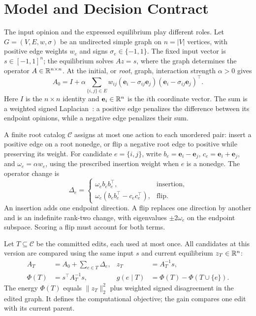 \section{Model and Decision Contract}
\label{sec:contract}

The input opinion and the expressed equilibrium play different roles. Let $G=(V,E,w,\sigma)$ be an undirected simple graph on $n=|V|$ vertices, with positive edge weights $w_e$ and signs $\sigma_e\in\{-1,1\}$. The fixed input vector is $s\in[-1,1]^n$; the equilibrium solves $Az=s$, where the graph determines the operator $A\in\mathbb R^{n\times n}$. At the initial, or \emph{root}, graph, interaction strength $\alpha>0$ gives
\begin{equation}
 A_0=I+\alpha\sum_{\{i,j\}\in E}w_{ij}
 (\mathbf e_i-\sigma_{ij}\mathbf e_j)
 (\mathbf e_i-\sigma_{ij}\mathbf e_j)^\top.
 \label{eq:operator}
\end{equation}
Here $I$ is the $n\times n$ identity and $\mathbf e_i\in\mathbb R^n$ is the $i$th coordinate vector. The sum is a weighted signed Laplacian~\cite{Kunegis_2010}: a positive edge penalizes the difference between its endpoint opinions, while a negative edge penalizes their sum.

A finite root catalog $\mathcal C$ assigns at most one action to each unordered pair: insert a positive edge on a root nonedge, or flip a negative root edge to positive while preserving its weight. For candidate $e=\{i,j\}$, write $b_e=\mathbf e_i-\mathbf e_j$, $c_e=\mathbf e_i+\mathbf e_j$, and $\omega_e=\alpha w_e$, using the prescribed insertion weight when $e$ is a nonedge. The operator change is
\begin{equation}
 \Delta_e=\begin{cases}
 \omega_e b_eb_e^\top,&\text{insertion},\\
 \omega_e(b_eb_e^\top-c_ec_e^\top),&\text{flip}.
 \end{cases}
 \label{eq:updates}
\end{equation}
An insertion adds one endpoint direction. A flip replaces one direction by another and is an indefinite rank-two change, with eigenvalues $\pm2\omega_e$ on the endpoint subspace. Scoring a flip must account for both terms.

Let $T\subseteq\mathcal C$ be the committed edits, each used at most once. All candidates at this version are compared using the same input $s$ and current equilibrium $z_T\in\mathbb R^n$:
\begin{equation}
 \begin{aligned}
 A_T&=A_0+\sum_{e\in T}\Delta_e,&z_T&=A_T^{-1}s,\\
 \Phi(T)&=s^\top A_T^{-1}s,&g(e\mid T)&=\Phi(T)-\Phi(T\cup\{e\}).
 \end{aligned}
 \label{eq:objective}
\end{equation}
The energy $\Phi(T)$ equals $\|z_T\|_2^2$ plus weighted signed disagreement in the edited graph. It defines the computational objective; the gain compares one edit with its current parent.


